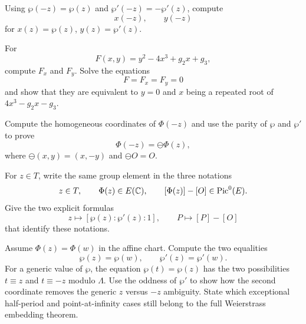 \begin{exercise}
Using \(\wp(-z)=\wp(z)\) and \(\wp'(-z)=-\wp'(z)\), compute
\[
  x(-z),\qquad y(-z)
\]
for \(x(z)=\wp(z)\), \(y(z)=\wp'(z)\).
\end{exercise}

\begin{exercise}
For
\[
  F(x,y)=y^2-4x^3+g_2x+g_3,
\]
compute \(F_x\) and \(F_y\).  Solve the equations
\[
  F=F_x=F_y=0
\]
and show that they are equivalent to \(y=0\) and \(x\) being a repeated root of
\(4x^3-g_2x-g_3\).
\end{exercise}

\begin{exercise}
Compute the homogeneous coordinates of \(\Phi(-z)\) and use the parity of
\(\wp\) and \(\wp'\) to prove
\[
  \Phi(-z)=\ominus\Phi(z),
\]
where \(\ominus(x,y)=(x,-y)\) and \(\ominus O=O\).
\end{exercise}

\begin{exercise}
For \(z\in T\), write the same group element in the three notations
\[
  z\in T,\qquad \Phi(z)\in E(\mathbb{C}),\qquad [\Phi(z)]-[O]\in\operatorname{Pic}^0(E).
\]
Give the two explicit formulas
\[
  z\longmapsto[\wp(z):\wp'(z):1],\qquad
  P\longmapsto[P]-[O]
\]
that identify these notations.
\end{exercise}

\begin{exercise}
Assume \(\Phi(z)=\Phi(w)\) in the affine chart.  Compute the two equalities
\[
  \wp(z)=\wp(w),\qquad \wp'(z)=\wp'(w).
\]
For a generic value of \(\wp\), the equation \(\wp(t)=\wp(z)\) has the two
possibilities \(t\equiv z\) and \(t\equiv -z\) modulo \(\Lambda\).  Use the
oddness of \(\wp'\) to show how the second coordinate removes the generic
\(z\) versus \(-z\) ambiguity.  State which exceptional half-period and
point-at-infinity cases still belong to the full Weierstrass embedding theorem.
\end{exercise}
